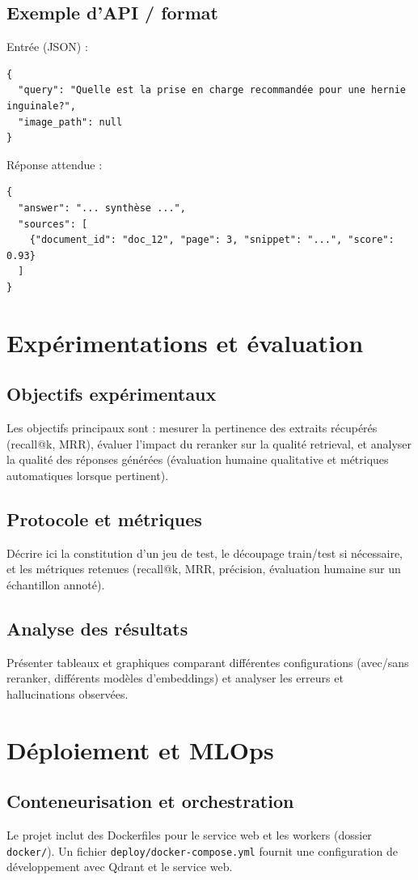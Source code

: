\documentclass[12pt,a4paper]{report}
\begin{document}
\section{Exemple d'API / format}
Entrée (JSON) :
\begin{verbatim}
{
  "query": "Quelle est la prise en charge recommandée pour une hernie inguinale?",
  "image_path": null
}
\end{verbatim}

Réponse attendue :
\begin{verbatim}
{
  "answer": "... synthèse ...",
  "sources": [
    {"document_id": "doc_12", "page": 3, "snippet": "...", "score": 0.93}
  ]
}
\end{verbatim}

\chapter{Expérimentations et évaluation}
\section{Objectifs expérimentaux}
Les objectifs principaux sont : mesurer la pertinence des extraits récupérés (recall@k, MRR), évaluer l'impact du reranker sur la qualité retrieval, et analyser la qualité des réponses générées (évaluation humaine qualitative et métriques automatiques lorsque pertinent).

\section{Protocole et métriques}
Décrire ici la constitution d'un jeu de test, le découpage train/test si nécessaire, et les métriques retenues (recall@k, MRR, précision, évaluation humaine sur un échantillon annoté).

\section{Analyse des résultats}
Présenter tableaux et graphiques comparant différentes configurations (avec/sans reranker, différents modèles d'embeddings) et analyser les erreurs et hallucinations observées.

\chapter{Déploiement et MLOps}
\section{Conteneurisation et orchestration}
Le projet inclut des Dockerfiles pour le service web et les workers (dossier \texttt{docker/}). Un fichier \texttt{deploy/docker-compose.yml} fournit une configuration de développement avec Qdrant et le service web.
\end{document}
